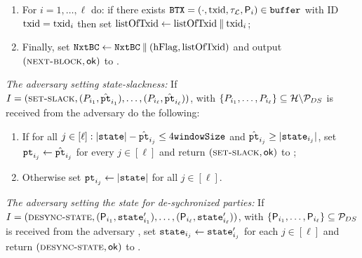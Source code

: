 \begin{cccFunctionality}
\begin{cccEnum}
\begin{cccItemize}[nosep]
\begin{enumerate}[label=(\alph*), leftmargin=*, nosep]
				\item For $i = 1, \ldots , \ell$ do: if there exists $\mathtt{BTX} = (\cdot, \mathrm{txid}, \tau_\mathcal{L}, \mathsf{P}_i) \in \mathtt{buffer}$ with ID $\mathrm{txid} = \mathrm{txid}_i$ then set $\mathrm{listOfTxid} \gets \mathrm{listOfTxid} \mathbin\Vert \mathrm{txid}_i$;

				\item Finally, set $\mathtt{NxtBC} \gets \mathtt{NxtBC} \mathbin\Vert (\mathrm{hFlag} ,\mathrm{listOfTxid})$ and output $(\textsc{next-block}, \mathsf{ok})$ to \adv.
			\end{enumerate}

			\item \emph{The adversary setting state-slackness:}
			If $I = (\textsc{set-slack}, (P_{i_1}, \hat{\mathtt{pt}}_{i_1}), \ldots, (P_{i_\ell}, \hat{\mathtt{pt}}_{i_\ell}))$, with $\{P_{i_1}, \ldots, P_{i_\ell}\} \subseteq \mathcal{H} \backslash \mathcal{P}_{DS}$ is received from the adversary \adv do the following:
			\begin{enumerate}[label=(\alph*), leftmargin=*, nosep]
				\item If for all $j \in [\ell] : |\mathtt{state}| - \hat{\mathtt{pt}}_{i_j} \le 4\mathtt{windowSize}$ and $\hat{\mathtt{pt}}_{i_j} \ge |\mathtt{state}_{i_j}|$, set $\mathtt{pt}_{i_j} \gets \hat{\mathtt{pt}}_{i_j}$ for every $j \in [\ell]$ and return $(\textsc{set-slack}, \mathsf{ok})$ to \adv;

				\item Otherwise set $\mathtt{pt}_{i_j} \gets |\mathtt{state}|$ for all $j \in [\ell]$.
			\end{enumerate}

			\item \emph{The adversary setting the state for de-sychronized parties:}
			If $I = (\textsc{desync-state}, (\mathsf{P}_{i_1},\allowbreak \mathtt{state}'_{i_1}), \ldots, (\mathsf{P}_{i_\ell}, \mathtt{state}'_{i_\ell}))$, with $\{\mathsf{P}_{i_1}, \ldots, \mathsf{P}_{i_\ell}\} \subseteq \mathcal{P}_{DS}$ is received from the adversary \adv, set $\mathtt{state}_{i_j} \gets \mathtt{state}'_{i_j}$ for each $j \in [\ell]$ and return $(\textsc{desync-state}, \mathsf{ok})$ to \adv.
		\end{cccItemize}
	\end{cccEnum}
\end{cccFunctionality}